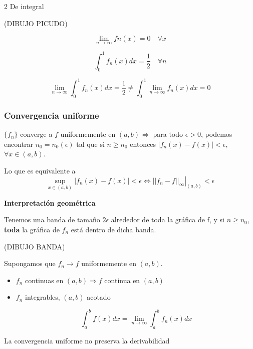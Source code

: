 		\begin{example}{2 De integral}

		(DIBUJO PICUDO)

		\[ \lim_{n \to \infty} fn(x) = 0 \quad \forall x \]

		\[ \int_0^1 f_n(x) dx = \frac{1}{2} \quad \forall n \]

		\[ \lim_{n \to \infty} \int_0^1 f_n(x) dx = \frac{1}{2} \neq \int_0^1 \lim_{n \to \infty} f_n(x)  dx = 0  \]


		\end{example}


	\subsubsection{Convergencia uniforme}

		\begin{defn}

			$\{f_n\}$ converge a $f$ uniformemente en $(a,b) \Leftrightarrow$ para todo $\epsilon > 0$, podemos encontrar ${n_0 = n_0(\epsilon)}$ tal que si $n \geq n_0$ entonces $|f_n(x) - f(x)| < \epsilon$, $\forall x \in (a,b)$.

			Lo que es equivalente a
			\[
				\sup_{x \in (a,b)} |f_n(x) - f(x)| < \epsilon
			\iff
				\left.||f_n - f||_{\infty}\right|_{(a,b)} < \epsilon
			\]

			\textbf{Interpretación geométrica}

			Tenemos una banda de tamaño $2\epsilon$ alrededor de toda la gráfica de f, y si $n \geq n_0$, {\bf toda} la gráfica de $f_n$ está dentro de dicha banda.

			(DIBUJO BANDA)

		\end{defn}

		\begin{theorem}

			Supongamos que $f_n \rightarrow f$ uniformemente en $(a,b)$.

			\begin{itemize}
				\item $f_n$ continuas en $(a,b) \Rightarrow f$ continua en $(a,b)$

				\item $f_n$ integrables, $(a,b)$ acotado

				\[\int^{b}_{a} f(x) dx = \lim_{n \rightarrow \infty} \int^{b}_{a} f_n(x) dx \]
			\end{itemize}

			\obs La convergencia uniforme no preserva la derivabilidad

		\end{theorem}

